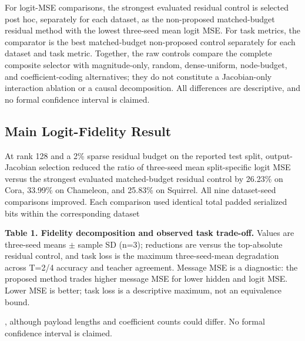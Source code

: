 \documentclass{article}
\begin{document}
For logit-MSE comparisons, the strongest evaluated residual control is selected post hoc, separately for each dataset, as the non-proposed matched-budget residual method with the lowest three-seed mean logit MSE. For task metrics, the comparator is the best matched-budget non-proposed control separately for each dataset and task metric. Together, the raw controls compare the complete composite selector with magnitude-only, random, dense-uniform, node-budget, and coefficient-coding alternatives; they do not constitute a Jacobian-only interaction ablation or a causal decomposition. All differences are descriptive, and no formal confidence interval is claimed.

\subsection{Main Logit-Fidelity Result}

\label{sec:main_logit_fidelity_result}

At rank 128 and a 2\% sparse residual budget on the reported test split, output-Jacobian selection reduced the ratio of three-seed mean split-specific logit MSE versus the strongest evaluated matched-budget residual control by 26.23\% on Cora, 33.99\% on Chameleon, and 25.83\% on Squirrel. All nine dataset-seed comparisons improved. Each comparison used identical total padded serialized bits within the corresponding dataset

\textbf{Table 1. Fidelity decomposition and observed task trade-off.} Values are three-seed means $\pm$ sample SD (n=3); reductions are versus the top-absolute residual control, and task loss is the maximum three-seed-mean degradation across T=2/4 accuracy and teacher agreement. Message MSE is a diagnostic: the proposed method trades higher message MSE for lower hidden and logit MSE. Lower MSE is better; task loss is a descriptive maximum, not an equivalence bound.

\begin{table}[ht]
\centering
\caption{Comparison of Dataset across Proposed logit MSE, Top-absolute logit MSE, Message MSE reduction, Hidden MSE reduction}
\label{tab:2}
\end{table}
, although payload lengths and coefficient counts could differ. No formal confidence interval is claimed.
\end{document}
